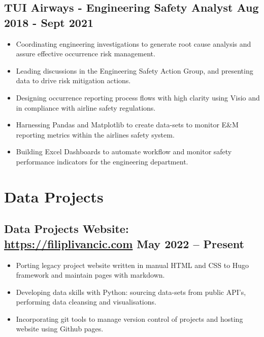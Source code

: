 \documentclass[a4paper,9pt]{article}
\begin{document}
\subsection*{\textbf{TUI Airways - Engineering Safety Analyst} \hfill  Aug 2018 - Sept 2021}
\begin{itemize}[noitemsep]
	\item Coordinating engineering investigations to generate root cause analysis and assure effective occurrence risk management.
	\item Leading discussions in the Engineering Safety Action Group, and presenting data to drive risk mitigation actions.
	\item Designing occurrence reporting process flows with high clarity using Visio and in compliance with airline safety regulations.
	\item Harnessing Pandas and Matplotlib to create data-sets to monitor E\&M reporting metrics within the airlines safety system.
	\item Building Excel Dashboards to automate workflow and monitor safety performance indicators for the engineering department.
\end{itemize}

%
%


\section*{Data Projects}

\subsection*{\textbf{Data Projects Website}: \url{https://filiplivancic.com} \hfill  May 2022 – Present}
\begin{itemize}[noitemsep]

	\item  Porting legacy project website written in manual HTML and CSS to Hugo framework and maintain pages with markdown.
	\item  Developing data skills with Python: sourcing data-sets from public API's, performing data cleansing and visualisations.
	\item  Incorporating git tools to manage version control of projects and hosting website using Github pages.

\end{itemize}
\end{document}
